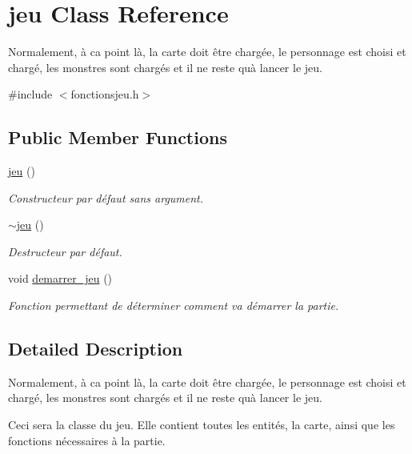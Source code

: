 \hypertarget{classjeu}{}\section{jeu Class Reference}
\label{classjeu}


Normalement, à ca point là, la carte doit être chargée, le personnage est choisi et chargé, les monstres sont chargés et il ne reste qu\textquotesingle{}à lancer le jeu.  




{\ttfamily \#include $<$fonctionsjeu.\+h$>$}

\subsection*{Public Member Functions}
\begin{DoxyCompactItemize}
\item 
\hyperlink{classjeu_a38513a7bfd0a7ea4e3a5612da2856016}{jeu} ()
\begin{DoxyCompactList}\small\item\em Constructeur par défaut sans argument. \end{DoxyCompactList}\item 
\mbox{\label{classjeu_a55385a33ef40e0579eb3a3634566c4a8}} 
\hyperlink{classjeu_a55385a33ef40e0579eb3a3634566c4a8}{$\sim$jeu} ()
\begin{DoxyCompactList}\small\item\em Destructeur par défaut. \end{DoxyCompactList}\item 
void \hyperlink{classjeu_aabf11934ce63bc5d71bbd27e1523fc45}{demarrer\+\_\+jeu} ()
\begin{DoxyCompactList}\small\item\em Fonction permettant de déterminer comment va démarrer la partie. \end{DoxyCompactList}\end{DoxyCompactItemize}


\subsection{Detailed Description}
Normalement, à ca point là, la carte doit être chargée, le personnage est choisi et chargé, les monstres sont chargés et il ne reste qu\textquotesingle{}à lancer le jeu. 

Ceci sera la classe du jeu. Elle contient toutes les entités, la carte, ainsi que les fonctions nécessaires à la partie.

